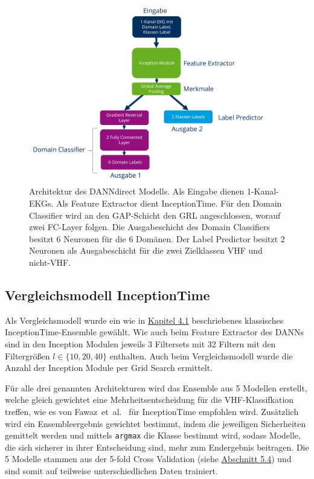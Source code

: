 \begin{figure}[!ht]%
\centering
	\includegraphics[width=1\textwidth]{./Bilder/DANNdirect_architektur.png}
\caption[DANNdirect Architektur]{Architektur des \gls{DANN}direct Modells. Als Eingabe dienen 1-Kanal-\gls{EKG}s. Als Feature Extractor dient InceptionTime. Für den Domain Classifier wird an den \gls{GAP}-Schicht den \gls{GRL} angeschlossen, worauf zwei \gls{FC}-Layer folgen. Die Ausgabeschicht des Domain Classifiers besitzt 6 Neuronen für die 6 Domänen. Der Label Predictor besitzt 2 Neuronen als Ausgabeschicht für die zwei Zielklassen \gls{VHF} und nicht-\gls{VHF}. } 
\label{fig:DANNdirect}
\end{figure} 


\subsection*{Vergleichsmodell InceptionTime}

Als Vergleichsmodell wurde ein wie in \hyperref[sec:InceptionTime]{Kapitel 4.1} beschriebenes klassisches InceptionTime-Ensemble  gewählt. Wie auch beim Feature Extractor des \gls{DANN}s sind in den Inception Modulen jeweils 3 Filtersets mit 32 Filtern mit den Filtergrößen $l \in \{10, 20, 40\}$ enthalten. Auch beim Vergleichsmodell wurde die Anzahl der Inception Module per Grid Search ermittelt.

Für alle drei genannten Architekturen wird das Ensemble aus 5 Modellen erstellt, welche gleich gewichtet eine Mehrheitsentscheidung für die \gls{VHF}-Klassifkation treffen, wie es von Fawaz~et~al.~\cite{fawaz_inceptiontime_2020} für InceptionTime empfohlen wird. Zusätzlich wird ein Ensembleergebnis gewichtet bestimmt, indem die jeweiligen Sicherheiten gemittelt werden und mittels \texttt{argmax} die Klasse bestimmt wird, sodass Modelle, die sich sicherer in ihrer Entscheidung sind, mehr zum Endergebnis beitragen. Die 5 Modelle stammen aus der 5-fold Cross Validation (siehe \hyperref[sec:trainingsprozess]{Abschnitt 5.4}) und sind somit auf teilweise unterschiedlichen Daten trainiert. 


